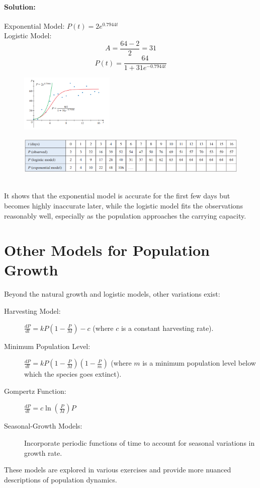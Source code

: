 \documentclass{article}
\begin{document}
\paragraph{Solution:}
Exponential Model: $P(t) = 2e^{0.7944t}$ \\
Logistic Model:
\[A = \frac{64 - 2}{2} = 31\]
\[P(t) = \frac{64}{1 + 31e^{-0.7944t}}\]
\begin{figure}[htbp] %
  \centering %
  \includegraphics[width=0.4\textwidth]{graph3.png} %
\end{figure}
\begin{figure}[htbp] %
  \centering %
  \includegraphics[width=1
  \textwidth]{graph4.png} %
\end{figure}
\\It shows that the exponential model is accurate for the first few days but becomes highly inaccurate later, while the logistic model fits the observations reasonably well, especially as the population approaches the carrying capacity.

\section*{Other Models for Population Growth}
Beyond the natural growth and logistic models, other variations exist:
\begin{description}
    \item[Harvesting Model:] $\frac{dP}{dt} = kP\left(1 - \frac{P}{M}\right) - c$ (where $c$ is a constant harvesting rate).
    \item[Minimum Population Level:] $\frac{dP}{dt} = kP\left(1 - \frac{P}{M}\right)\left(1 - \frac{P}{m}\right)$ (where $m$ is a minimum population level below which the species goes extinct).
    \item[Gompertz Function:] $\frac{dP}{dt} = c \ln\left(\frac{P}{M}\right) P$
    \item[Seasonal-Growth Models:] Incorporate periodic functions of time to account for seasonal variations in growth rate.
\end{description}
These models are explored in various exercises and provide more nuanced descriptions of population dynamics.
\end{document}
